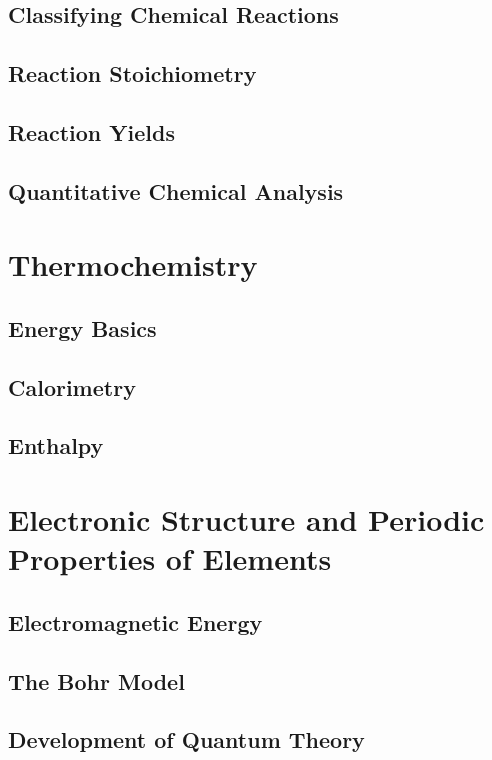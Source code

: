 \documentclass[12pt, openany, letterpaper]{memoir}
\begin{document}
\section{Classifying Chemical Reactions}

\section{Reaction Stoichiometry}

\section{Reaction Yields}

\section{Quantitative Chemical Analysis}

\chapter{Thermochemistry}

\section{Energy Basics}

\section{Calorimetry}

\section{Enthalpy}

\chapter{Electronic Structure and Periodic Properties of Elements}

\section{Electromagnetic Energy}

\section{The Bohr Model}

\section{Development of Quantum Theory}
\end{document}
